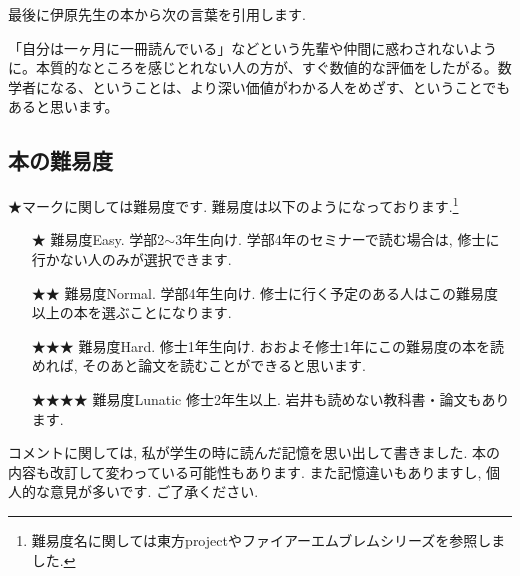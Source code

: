 最後に伊原先生の本から次の言葉を引用します. 
\begin{tcolorbox}[mybox]
「自分は一ヶ月に一冊読んでいる」などという先輩や仲間に惑わされないように。本質的なところを感じとれない人の方が、すぐ数値的な評価をしたがる。数学者になる、ということは、より深い価値がわかる人をめざす、ということでもあると思います。
\end{tcolorbox}


\subsection{本の難易度}

★マークに関しては難易度です. 難易度は以下のようになっております.\footnote{難易度名に関しては東方projectやファイアーエムブレムシリーズを参照しました.} 
\vspace{-8pt}
\begin{itemize}
  \setlength{\parskip}{0cm} %
  \setlength{\itemsep}{4pt} %
\item[★] 難易度Easy. 学部2$\sim$3年生向け. 学部4年のセミナーで読む場合は, 修士に行かない人のみが選択できます. 
\item[★★] 難易度Normal. 学部4年生向け. 修士に行く予定のある人はこの難易度以上の本を選ぶことになります.
\item[★★★] 難易度Hard. 修士1年生向け. おおよそ修士1年にこの難易度の本を読めれば, そのあと論文を読むことができると思います. 
\item[★★★★] 難易度Lunatic 修士2年生以上. 岩井も読めない教科書・論文もあります.
\end{itemize}

コメントに関しては, 私が学生の時に読んだ記憶を思い出して書きました. 本の内容も改訂して変わっている可能性もあります. また記憶違いもありますし, 個人的な意見が多いです. ご了承ください. 

